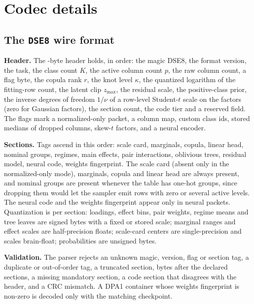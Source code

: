 \documentclass[10pt,letterpaper,twocolumn]{article}
\newcommand{\runin}[1]{\par\smallskip\noindent\textbf{#1.}\hspace{0.45em}\ignorespaces}
\newcommand{\cli}[1]{{\ttfamily\fontsize{8.9}{11}\selectfont #1}}
\begin{document}
\section{Codec details}\label{app:codec}
\subsection{The \texttt{DSE8} wire format}
\runin{Header} The -byte header holds, in order: the magic \cli{DSE8}, the format version, the task, the class count $K$, the active column count $p$, the raw column count, a flag byte, the copula rank $r$, the knot level $\kappa$, the quantized logarithm of the fitting-row count, the latent clip $z_{\max}$, the residual scale, the positive-class prior, the inverse degrees of freedom $1/\nu$ of a row-level Student-$t$ scale on the factors (zero for Gaussian factors), the section count, the code tier and a reserved field. The flags mark a normalized-only packet, a column map, custom class ids, stored medians of dropped columns, skew-$t$ factors, and a neural encoder.

\runin{Sections} Tags ascend in this order: scale card, marginals, copula, linear head, nominal groups, regimes, main effects, pair interactions, oblivious trees, residual model, neural code, weights fingerprint. The scale card (absent only in the normalized-only mode), marginals, copula and linear head are always present, and nominal groups are present whenever the table has one-hot groups, since dropping them would let the sampler emit rows with zero or several active levels. The neural code and the weights fingerprint appear only in neural packets. Quantization is per section: loadings, effect bins, pair weights, regime means and tree leaves are signed bytes with a fixed or stored scale; marginal ranges and effect scales are half-precision floats; scale-card centers are single-precision and scales brain-float; probabilities are unsigned bytes.

\runin{Validation} The parser rejects an unknown magic, version, flag or section tag, a duplicate or out-of-order tag, a truncated section, bytes after the declared sections, a missing mandatory section, a code section that disagrees with the header, and a CRC mismatch. A \cli{DPA1} container whose weights fingerprint is non-zero is decoded only with the matching checkpoint.
\end{document}
